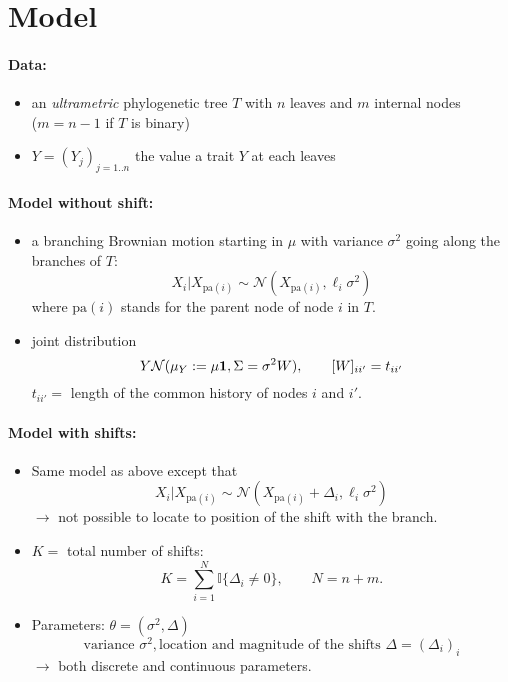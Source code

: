 \documentclass[12pt]{article}
\newcommand{\Ncal}{\mathcal{N}}
\newcommand{\Ibb}{\mathbb{I}}
\newcommand{\pa}{\text{pa}}
\newcommand{\ra}{$\rightarrow$\xspace}
\begin{document}

{\large
\section{Model}

\paragraph{Data:}
\begin{itemize}
\item an {\sl ultrametric} phylogenetic tree $T$ with $n$ leaves and $m$ internal nodes \\
	($m = n-1$ if $T$ is binary)
\item $Y = (Y_j)_{j = 1..n}$ the value a trait $Y$ at each leaves
\end{itemize}

\paragraph{Model without shift:}
\begin{itemize}
\item a branching Brownian motion starting in $\mu$ with variance $\sigma^2$ going along the branches of $T$:
$$
X_i | X_{\pa(i)} \sim \Ncal(X_{\pa(i)}, \ell_i\sigma^2)
$$
where $\pa(i)$ stands for the parent node of node $i$ in $T$.
\item joint distribution
$$
Y \Ncal(\mu_Y := \mu {\bf 1}, \Sigma = \sigma^2 W), \qquad [W]_{ii'} = t_{ii'}
$$
$t_{ii'} =$ length of the common history of nodes $i$ and $i'$.
\end{itemize}

\paragraph{Model with shifts:}
\begin{itemize}
\item Same model as above except that
$$
X_i | X_{\pa(i)} \sim \Ncal(X_{\pa(i)} + \Delta_i, \ell_i\sigma^2)
$$
\ra not possible to locate to position of the shift with the branch.
\item $K =$ total number of shifts:
$$
K = \sum_{i=1}^N \Ibb\{\Delta_i \neq 0\}, \qquad N = n+m.
$$
\item Parameters: $\theta = (\sigma^2, \Delta)$
$$
\text{variance }\sigma^2, \text{location and magnitude of the shifts }\Delta = (\Delta_i)_i
$$
\ra both discrete and continuous parameters.
\end{itemize}

}
\end{document}
